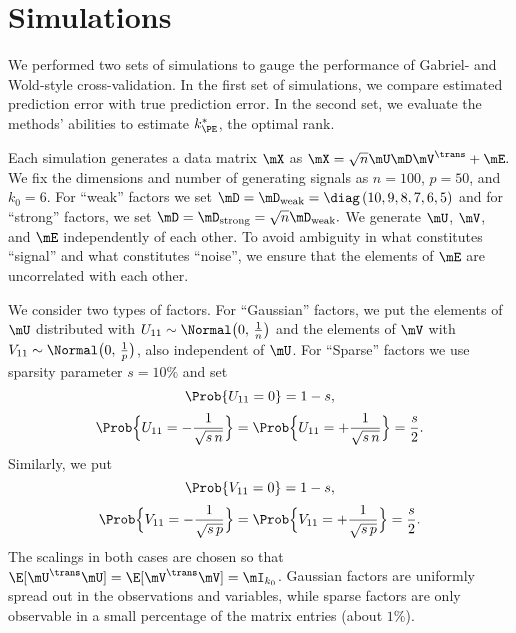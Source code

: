 \clearpage

\section{Simulations}

We performed two sets of simulations to gauge the performance of Gabriel- and Wold-style cross-validation.  In the first set of simulations, we compare estimated prediction error with true prediction error.  In the second set, we evaluate the methods' abilities to estimate $k_{\PE}^\ast$, the optimal rank.

Each simulation generates a data matrix $\mX$ as 
\(
    \mX = \sqrt{n} \mU \mD \mV^\trans + \mE.
\)
We fix the dimensions and number of generating signals as $n = 100$, $p = 50$,
and $k_0 = 6$.  For ``weak'' factors we set 
\(
    \mD 
    = 
    \mD_\text{weak}
    =
    \diag \left(
        10, 9, 8, 7, 6, 5
    \right)
\)
and for ``strong'' factors, we set
\(
    \mD
    =
    \mD_\text{strong}
    =
    \sqrt{n} \mD_\text{weak}.
\)
We generate $\mU$, $\mV$, and $\mE$ independently of each other.  To avoid 
ambiguity in what constitutes ``signal'' and what constitutes ``noise'', we 
ensure that the elements of $\mE$ are uncorrelated with each other.

We consider two types of factors.  For ``Gaussian'' factors, we put the elements of $\mU$ distributed \iid with
$U_{11} \sim \Normal\big( 0, \, \frac{1}{n} \big)$ and the elements of
$\mV$ \iid with $V_{11} \sim \Normal\big( 0, \, \frac{1}{p} \big)$, also independent of $\mU$.  For ``Sparse'' factors we use sparsity parameter $s = 10\%$ and set
\[
    \Prob\{ U_{11} = 0 \} = 1 - s,
\]
\[
    \Prob\Big\{ U_{11} = -\frac{1}{\sqrt{s \, n}} \Big\}
    =
    \Prob\Big\{ U_{11} = +\frac{1}{\sqrt{s \, n}} \Big\}    
    = 
    \frac{s}{2}.
\]
Similarly, we put
\[
    \Prob\{ V_{11} = 0 \} = 1 - s,
\]
\[
    \Prob\Big\{ V_{11} = -\frac{1}{\sqrt{s \, p}} \Big\}
    =
    \Prob\Big\{ V_{11} = +\frac{1}{\sqrt{s \, p}} \Big\}    
    = 
    \frac{s}{2}.
\]
The scalings in both cases are chosen so that $\E [\mU^\trans \mU] = \E 
[\mV^\trans \mV] = \mI_{k_0}$.  Gaussian factors are uniformly spread out in the observations and variables, while sparse factors are only observable in a small percentage of the matrix entries (about $1\%$).

